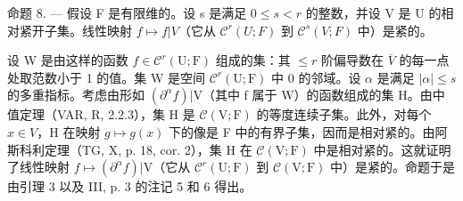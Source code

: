 命题 8. --- 假设 F 是有限维的。设 s 是满足 \(0 \leqslant s < r\) 的整数，并设 V 是 U 的相对紧开子集。线性映射 \(f \mapsto f|V\)（它从 \(\mathcal{C}^{r}(U;F)\) 到 \(\mathcal{C}^{s}(V;F)\) 中）是紧的。

设 W 是由这样的函数 \(f \in \mathcal{C}^{r}(\mathrm{U};\mathrm{F})\) 组成的集：其 \(\leqslant r\) 阶偏导数在 \(\overline{V}\) 的每一点处取范数小于 1 的值。集 W 是空间 \(\mathcal{C}^{r}(\mathrm{U};\mathrm{F})\) 中 0 的邻域。设 \(\alpha\) 是满足 \(|\alpha| \leqslant s\) 的多重指标。考虑由形如 \((\partial^{\alpha}f)|\mathrm{V}\)（其中 f 属于 W）的函数组成的集 H。由中值定理（VAR, R, 2.2.3），集 H 是 \(\mathcal{C}(\mathrm{V};\mathrm{F})\) 的等度连续子集。此外，对每个 \(x \in V\)，H 在映射 \(g \mapsto g(x)\) 下的像是 F 中的有界子集，因而是相对紧的。由阿斯科利定理（TG, X, p. 18, cor. 2），集 H 在 \(\mathcal{C}(\mathrm{V};\mathrm{F})\) 中是相对紧的。这就证明了线性映射 \(f \mapsto (\partial^{\alpha}f)|\mathrm{V}\)（它从 \(\mathcal{C}^{r}(\mathrm{U};\mathrm{F})\) 到 \(\mathcal{C}(\mathrm{V};\mathrm{F})\) 中）是紧的。命题于是由引理 3 以及 III, p. 3 的注记 5 和 6 得出。

